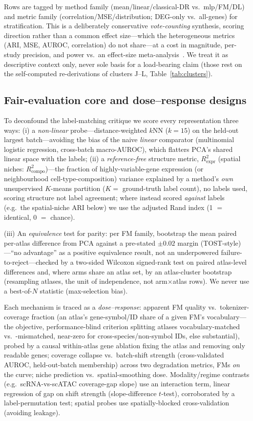 \documentclass[journal]{IEEEtran}
\begin{document}
Rows are tagged by method family (mean/linear/classical-DR vs.\ mlp/FM/DL) and metric family (correlation/MSE/distribution; DEG-only vs.\ all-genes) for stratification. This is a deliberately conservative \emph{vote-counting} synthesis, scoring direction rather than a common effect size---which the heterogeneous metrics (ARI, MSE, AUROC, correlation) do not share---at a cost in magnitude, per-study precision, and power vs.\ an effect-size meta-analysis~\cite{borenstein2009}. We treat it as descriptive context only, never sole basis for a load-bearing claim (those rest on the self-computed re-derivations of clusters J--L, Table~\ref{tab:clusters}).
\subsection{Fair-evaluation core and dose--response designs}
To deconfound the label-matching critique we score every representation three ways: (i) a \emph{non-linear} probe---distance-weighted $k$NN ($k{=}15$) on the held-out largest batch---avoiding the bias of the naive \emph{linear} comparator (multinomial logistic regression, cross-batch macro-AUROC), which flatters PCA's shared linear space with the labels; (ii) a \emph{reference-free} structure metric, $R^2_{\mathrm{expr}}$ (spatial niches: $R^2_{\mathrm{compo}}$)---the fraction of highly-variable-gene expression (or neighbourhood cell-type-composition) variance explained by a method's \emph{own} unsupervised $K$-means partition ($K=$ ground-truth label count), no labels used, scoring structure not label agreement; where instead scored \emph{against} labels (e.g.\ the spatial-niche ARI below) we use the adjusted Rand index (1 $=$ identical, 0 $=$ chance).

(iii) An \emph{equivalence} test for parity: per FM family, bootstrap the mean paired per-atlas difference from PCA against a pre-stated $\pm0.02$ margin (TOST-style)---``no advantage'' as a positive equivalence result, not an underpowered failure-to-reject---checked by a two-sided Wilcoxon signed-rank test on paired atlas-level differences and, where arms share an atlas set, by an atlas-cluster bootstrap (resampling atlases, the unit of independence, not arm$\times$atlas rows). We never use a best-of-$N$ statistic (max-selection bias).

Each mechanism is traced as a \emph{dose--response}: apparent FM quality vs.\ tokenizer-coverage fraction (an atlas's gene-symbol/ID share of a given FM's vocabulary---the objective, performance-blind criterion splitting atlases vocabulary-matched vs.\ -mismatched, near-zero for cross-species/non-symbol IDs, else substantial), probed by a causal within-atlas gene ablation fixing the atlas and removing only readable genes; coverage collapse vs.\ batch-shift strength (cross-validated AUROC, held-out-batch membership) across two degradation metrics, FMs \emph{on} the curve; niche prediction vs.\ spatial-smoothing dose. Modality/regime contrasts (e.g.\ scRNA-vs-scATAC coverage-gap slope) use an interaction term, linear regression of gap on shift strength (slope-difference $t$-test), corroborated by a label-permutation test; spatial probes use spatially-blocked cross-validation (avoiding leakage).
\end{document}
